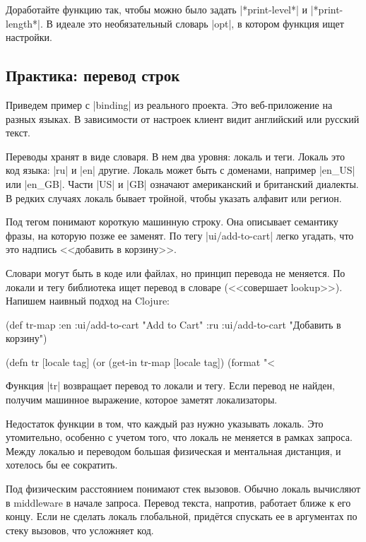 Доработайте функцию так, чтобы можно было задать \spverb|*print-level*| и
\spverb|*print-length*|. В идеале это необязательный словарь \spverb|opt|, в
котором функция ищет настройки.

\subsection{Практика: перевод строк}

Приведем пример с \spverb|binding| из реального проекта. Это веб-приложение на
разных языках. В зависимости от настроек клиент видит английский или русский
текст.

Переводы хранят в виде словаря. В нем два уровня: локаль и теги. Локаль это код
языка: \spverb|ru| и \spverb|en| другие. Локаль может быть с доменами, например
\spverb|en_US| или \spverb|en_GB|. Части \spverb|US| и \spverb|GB| означают
американский и британский диалекты. В редких случаях локаль бывает тройной,
чтобы указать алфавит или регион.

Под тегом понимают короткую машинную строку. Она описывает семантику фразы, на
которую позже ее заменят. По тегу \spverb|ui/add-to-cart| легко
угадать, что это надпись <<добавить в корзину>>.

Словари могут быть в коде или файлах, но принцип перевода не меняется. По локали
и тегу библиотека ищет перевод в словаре (<<совершает lookup>>). Напишем
наивный подход на Clojure:

  \begin{clojure}
(def tr-map
  {:en {:ui/add-to-cart "Add to Cart"}
   :ru {:ui/add-to-cart "Добавить в корзину"}})

(defn tr [locale tag]
  (or (get-in tr-map [locale tag])
      (format "<%
  \end{clojure}

Функция \spverb|tr| возвращает перевод то локали и тегу. Если перевод не найден,
получим машинное выражение, которое заметят локализаторы.

Недостаток функции в том, что каждый раз нужно указывать локаль. Это
утомительно, особенно с учетом того, что локаль не меняется в рамках
запроса. Между локалью и переводом большая физическая и ментальная
дистанция, и хотелось бы ее сократить.

Под физическим расстоянием понимают стек вызовов. Обычно локаль вычисляют в
middleware в начале запроса. Перевод текста, напротив, работает ближе к его
концу. Если не сделать локаль глобальной, прид\"{е}тся спускать ее в аргументах по
стеку вызовов, что усложняет код.

